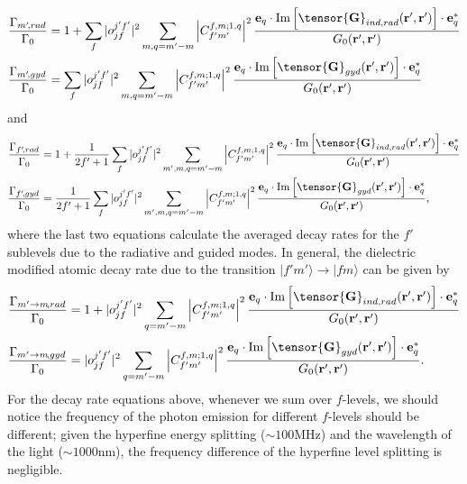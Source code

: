 \documentclass[preprint,aps,pra,onecolumn,superscriptaddress]{revtex4-1} %
\def\ket#1{\lvert{#1}\rangle}%
\begin{document}
\begin{appendix}
\begin{align}
\frac{\Gamma_{m'\!,rad}}{\Gamma_0} &= 1+ \sum_f |o_{jf}^{j'f'}|^2\sum_{m,q=m'-m} \left|C_{f'm'}^{f,m;1,q}\right|^2\frac{\mathbf{e}_q\cdot \mathrm{Im}\left[\tensor{\mathbf{G}}_{ind,rad}(\mathbf{r}',\mathbf{r}')\right]\cdot \mathbf{e}_q^*}{G_0(\mathbf{r}',\mathbf{r}')}\\
\frac{\Gamma_{m'\!,gyd}}{\Gamma_0} &= \sum_f |o_{jf}^{j'f'}|^2\sum_{m,q=m'-m} \left|C_{f'm'}^{f,m;1,q}\right|^2 \frac{\mathbf{e}_q\cdot \mathrm{Im}\left[ \tensor{\mathbf{G}}_{gyd}(\mathbf{r}',\mathbf{r}')\right]\cdot \mathbf{e}_q^*}{ G_0(\mathbf{r}',\mathbf{r}')}
\end{align}
and 
\begin{align}
\frac{\Gamma_{f'\!,rad}}{\Gamma_0} &= 1+ \frac{1}{2f'+1}\sum_f |o_{jf}^{j'f'}|^2\sum_{m',m,q=m'-m} \left|C_{f'm'}^{f,m;1,q}\right|^2\frac{\mathbf{e}_q\cdot \mathrm{Im}\left[\tensor{\mathbf{G}}_{ind,rad}(\mathbf{r}',\mathbf{r}')\right]\cdot \mathbf{e}_q^*}{G_0(\mathbf{r}',\mathbf{r}')}\\
\frac{\Gamma_{f'\!,gyd}}{\Gamma_0} &= \frac{1}{2f'+1}\sum_f |o_{jf}^{j'f'}|^2\sum_{m',m,q=m'-m} \left|C_{f'm'}^{f,m;1,q}\right|^2 \frac{\mathbf{e}_q\cdot \mathrm{Im}\left[ \tensor{\mathbf{G}}_{gyd}(\mathbf{r}',\mathbf{r}')\right]\cdot \mathbf{e}_q^*}{ G_0(\mathbf{r}',\mathbf{r}')},
\end{align}
where the last two equations calculate the averaged decay rates for the $ f' $ sublevels due to the radiative and guided modes. 
In general, the dielectric modified atomic decay rate due to the transition $ \ket{f'm'} \rightarrow \ket{fm}$ can be given by 
\begin{align}
\frac{\Gamma_{m'\rightarrow m\!,rad}}{\Gamma_0} &= 1+ |o_{jf}^{j'f'}|^2\sum_{q=m'-m} \left|C_{f'm'}^{f,m;1,q}\right|^2\frac{\mathbf{e}_q\cdot \mathrm{Im}\left[\tensor{\mathbf{G}}_{ind,rad}(\mathbf{r}',\mathbf{r}')\right]\cdot \mathbf{e}_q^*}{G_0(\mathbf{r}',\mathbf{r}')}\\
\frac{\Gamma_{m'\rightarrow m\!,gyd}}{\Gamma_0} &= |o_{jf}^{j'f'}|^2\sum_{q=m'-m} \left|C_{f'm'}^{f,m;1,q}\right|^2 \frac{\mathbf{e}_q\cdot \mathrm{Im}\left[ \tensor{\mathbf{G}}_{gyd}(\mathbf{r}',\mathbf{r}')\right]\cdot \mathbf{e}_q^*}{ G_0(\mathbf{r}',\mathbf{r}')}.
\end{align}
For the decay rate equations above, whenever we sum over $ f $-levels, we should notice the frequency of the photon emission for different $ f $-levels should be different; given the hyperfine energy splitting ($ \sim 100 $MHz) and the wavelength of the light ($ \sim 1000 $nm), the frequency difference of the hyperfine level splitting is negligible. 


\end{appendix}
\end{document}
